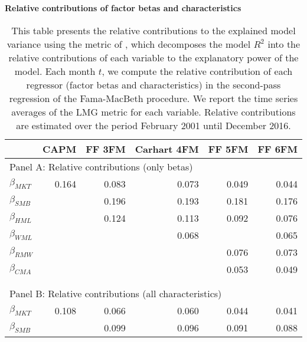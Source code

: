 \begin{singlespacing}
\begin{table}[h!]
\setlength{\tabcolsep}{18pt}
 \centering
 {\captionsetup{justification=centering,singlelinecheck=off}
\caption{\bfseries Relative contributions of factor betas and characteristics}}
\caption*{This table presents the relative contributions to the explained model variance using the metric of \citet{lindeman1980introduction}, which decomposes the model $R^2$ into the relative contributions of each variable to the explanatory power of the model. Each month $t$, we compute the relative contribution of each regressor (factor betas and characteristics) in the second-pass regression of the Fama-MacBeth procedure. We report the time series averages of the LMG metric for each variable. Relative contributions are estimated over the period February 2001 until December 2016.}
 \small
\label{my-label}
\begin{tabular}{lrrrrr}
\hline
          & CAPM      & FF 3FM    & Carhart 4FM    & FF 5FM    & FF 6FM      \\ \hline
\multicolumn{6}{l}{Panel A:  Relative contributions  (only betas)}         \\
$\beta_{MKT}$         & 0.164       & 0.083     & 0.073     & 0.049     & 0.044     \\
$\beta_{SMB}$         &             & 0.196     & 0.193     & 0.181     & 0.176     \\
$\beta_{HML}$         &             & 0.124     & 0.113     & 0.092     & 0.076     \\
$\beta_{WML}$         &             &           & 0.068     &           & 0.065     \\
$\beta_{RMW}$         &             &           &           & 0.076     & 0.073     \\
$\beta_{CMA}$              &             &           &           & 0.053     & 0.049     \\
             &             &           &           &           &           \\
             &             &           &           &           &           \\
\multicolumn{6}{l}{Panel B:  Relative contributions (all characteristics)} \\
$\beta_{MKT}$               & 0.108       & 0.066     & 0.060     & 0.044     & 0.041     \\
$\beta_{SMB}$               &             & 0.099     & 0.096     & 0.091     & 0.088     \\

\end{tabular}
\end{table}
\end{singlespacing}
